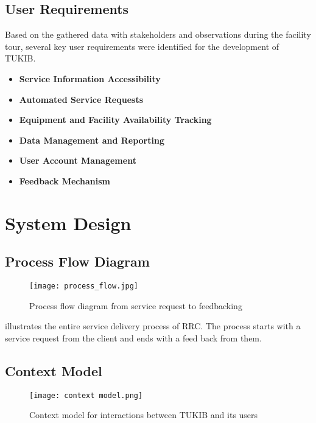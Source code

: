 \subsection{User Requirements}

Based on the gathered data with stakeholders and observations during the facility tour, several key user requirements were identified for the development of TUKIB. 

\begin{itemize}
	\item \textbf{Service Information Accessibility}
	\item \textbf{Automated Service Requests}
	\item \textbf{Equipment and Facility Availability Tracking}
	\item \textbf{Data Management and Reporting}
	\item \textbf{User Account Management}
	\item \textbf{Feedback Mechanism}
\end{itemize}

\newpage

\section{System Design}

\subsection{Process Flow Diagram}

\begin{figure}[h]
	\centering 
	\texttt{[image: process\_flow.jpg]}
	\caption{Process flow diagram from service request to feedbacking}
	\label{fig:process_flow}
\end{figure}

 illustrates the entire service delivery process of RRC. The process starts with a service request from the client and ends with a feed back from them.

\newpage

\subsection{Context Model}

\begin{figure}[h]
	\centering 
	\texttt{[image: context model.png]}
	\caption{Context model for interactions between TUKIB and its users}
	\label{fig:context_model}
\end{figure}

